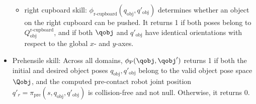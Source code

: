 \begin{itemize}
\begin{itemize}
        \item right cupboard skill: \( \phi_{\text{r-cupboard}}(q_{\text{obj}}, q'_{\text{obj}}) \) determines whether an object on the right cupboard can be pushed. It returns 1 if both poses belong to \( Q^\text{r-cupboard}_{\text{obj}} \), and if both $\qobj$ and $q'_\text{obj}$ have identical orientations with respect to the global \( x \)- and \( y \)-axes.
    \end{itemize}
    \item[] Prehensile skill: Across all domains, $\phi_\text{P}(\qobj, \qobj')$ returns 1 if both the initial and desired object poses \( q_\text{obj}, q'_\text{obj} \) belong to the valid object pose space \( \Qobj \), and the computed pre-contact robot joint position \( q'_r = \pi_{\text{pre}}(s, q_{\text{obj}}, q'_{\text{obj}}) \) is collision-free and not null. Otherwise, it returns 0.
\end{itemize}
